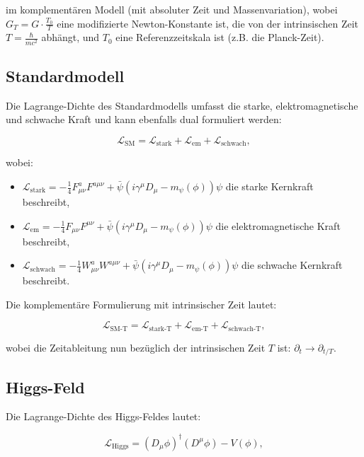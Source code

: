 \documentclass{article}
\begin{document}
	im komplementären Modell (mit absoluter Zeit und Massenvariation), wobei $G_T = G \cdot \frac{T_0}{T}$ eine modifizierte Newton-Konstante ist, die von der intrinsischen Zeit $T = \frac{\hbar}{mc^2}$ abhängt, und $T_0$ eine Referenzzeitskala ist (z.B. die Planck-Zeit).
	
	\subsection{Standardmodell}
	Die Lagrange-Dichte des Standardmodells umfasst die starke, elektromagnetische und schwache Kraft und kann ebenfalls dual formuliert werden:
	
	\begin{equation}
		\mathcal{L}_\text{SM} = \mathcal{L}_\text{stark} + \mathcal{L}_\text{em} + \mathcal{L}_\text{schwach},
	\end{equation}
	
	wobei:
	\begin{itemize}
		\item $\mathcal{L}_\text{stark} = -\frac{1}{4} F_{\mu\nu}^a F^{a\mu\nu} + \bar{\psi}(i \gamma^\mu D_\mu - m_\psi(\phi))\psi$ die starke Kernkraft beschreibt,
		\item $\mathcal{L}_\text{em} = -\frac{1}{4} F_{\mu\nu} F^{\mu\nu} + \bar{\psi}(i \gamma^\mu D_\mu - m_\psi(\phi))\psi$ die elektromagnetische Kraft beschreibt,
		\item $\mathcal{L}_\text{schwach} = -\frac{1}{4} W_{\mu\nu}^a W^{a\mu\nu} + \bar{\psi}(i \gamma^\mu D_\mu - m_\psi(\phi))\psi$ die schwache Kernkraft beschreibt.
	\end{itemize}
	
	Die komplementäre Formulierung mit intrinsischer Zeit lautet:
	
	\begin{equation}
		\mathcal{L}_\text{SM-T} = \mathcal{L}_\text{stark-T} + \mathcal{L}_\text{em-T} + \mathcal{L}_\text{schwach-T},
	\end{equation}
	
	wobei die Zeitableitung nun bezüglich der intrinsischen Zeit $T$ ist: $\partial_t \rightarrow \partial_{t/T}$.
	
	\subsection{Higgs-Feld}
	Die Lagrange-Dichte des Higgs-Feldes lautet:
	
	\begin{equation}
		\mathcal{L}_\text{Higgs} = (D_\mu \phi)^\dagger (D^\mu \phi) - V(\phi),
	\end{equation}
	
\end{document}
